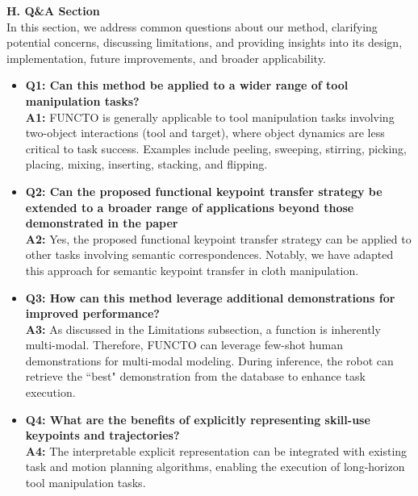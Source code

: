 \newpage
\noindent \textbf{H. Q\&A Section} \\
In this section, we address common questions about our method, clarifying potential concerns, discussing limitations, and providing insights into its design, implementation, future improvements, and broader applicability. \\

\begin{itemize}
    \item \textbf{Q1: Can this method be applied to a wider range of tool manipulation tasks?} \\
    \textbf{A1:} FUNCTO is generally applicable to tool manipulation tasks involving two-object interactions (tool and target), where object dynamics are less critical to task success. Examples include peeling, sweeping, stirring, picking, placing, mixing, inserting, stacking, and flipping.\\

    \item \textbf{Q2: Can the proposed functional keypoint transfer strategy be extended to a broader range of applications beyond those demonstrated in the paper} \\
    \textbf{A2:} Yes, the proposed functional keypoint transfer strategy can be applied to other tasks involving semantic correspondences. Notably, we have adapted this approach for semantic keypoint transfer in cloth manipulation. \\

    \item \textbf{Q3: How can this method leverage additional demonstrations for improved performance?} \\
    \textbf{A3:} As discussed in the Limitations subsection, a function is inherently multi-modal. Therefore, FUNCTO can leverage few-shot human demonstrations for multi-modal modeling. During inference, the robot can retrieve the ``best" demonstration from the database to enhance task execution. \\

    \item \textbf{Q4: What are the benefits of explicitly representing skill-use keypoints and trajectories?} \\
    \textbf{A4:} The interpretable explicit representation can be integrated with existing task and motion planning algorithms, enabling the execution of long-horizon tool manipulation tasks. \\



\end{itemize}
